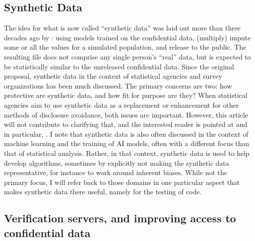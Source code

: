 \documentclass[]{hdsr}
\begin{document}

\subsection{Synthetic Data}

The idea for what is now called ``synthetic data'' was laid out more than three decades ago by \citet{rubin_discussion_1993}: using models trained on the confidential data, (multiply) impute some or all the values for a simulated population, and release to the public. The resulting file does not comprise any single person's ``real'' data, but is expected to be statistically similar to the unreleased confidential data. Since the original proposal, synthetic data in the context of statistical agencies and survey organizations has been much discussed. The primary concerns are two: how protective are synthetic data, and how fit for purpose are they? When statistical agencies aim to use synthetic data as a replacement or enhancement for other methods of disclosure avoidance, both issues are important. However, this article will not contribute to clarifying that, and the interested reader is pointed at \citet{raghunathan_synthetic_2021,reiter_synthetic_2023} and in particular, \citet{raghunathan_roadmap_2023b,raghu-nber-2024}. I note that synthetic data is also often discussed in the context of machine learning and the training of AI models, often with a different focus than that of statistical analysis. Rather, in that context, synthetic data is used to help develop algorithms, sometimes by explicitly not making the synthetic data representative, for instance to work around inherent biases. While not the primary focus, I will refer back to those domains in one particular aspect that makes synthetic data there useful, namely for the testing of code. 

\subsection{Verification servers, and improving access to confidential data}
\label{sec1}
\end{document}
